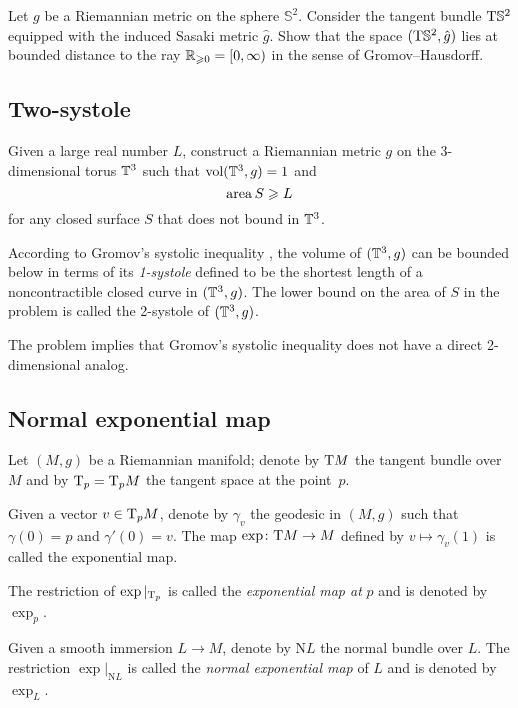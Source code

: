 \begin{pr}
Let $g$ be a Riemannian metric on the sphere $\mathbb{S}^2$.
Consider the tangent bundle $\mathrm{T} \mathbb{S}^2$ 
equipped with the induced Sasaki metric $\hat g$.
Show that
the space $(\mathrm{T} \mathbb{S}^2, \hat g)$ lies at bounded distance to the ray $\mathbb{R}_{\geqslant 0}=[0,\infty)$ in the sense of Gromov--Hausdorff.
\end{pr}


\subsection*{Two-systole}

\begin{pr} Given a large real number $L$,
construct a Riemannian metric $g$ on the 3-dimensional torus $\mathbb{T}^3$ such that $\operatorname{\rm vol}\nolimits(\mathbb{T}^3,g)=1$
and \[\operatorname{\rm area}\nolimits S\geqslant L\]
for any closed surface $S$ that does not bound in $\mathbb{T}^3$.
\end{pr}

According to Gromov's systolic inequality \cite{gromov-filling}, the volume of $(\mathbb{T}^3,g)$ can be bounded below in terms of its \emph{1-systole} defined to be the shortest length of a noncontractible closed curve in $(\mathbb{T}^3,g)$.
The lower bound on the area of $S$ in the problem is called the 2-systole of $(\mathbb{T}^3,g)$.

The problem implies that Gromov's systolic inequality does not have a direct 2-dimensional analog.

\subsection*{Normal exponential map\easy}
\label{Normal exponential map}
\label{page:Normal exponential map}

Let $(M,g)$ be a Riemannian manifold;
denote by $\mathrm{T} M$ the tangent bundle over $M$ and by $\mathrm{T}_p=\mathrm{T}_pM$ the tangent space at the point~$p$.

Given a vector $v\in\mathrm{T}_pM$, denote by $\gamma_v$ the geodesic in $(M,g)$
such that $\gamma(0)=p$ and $\gamma'(0)=v$.
The map $\exp\colon\mathrm{T} M\to M$ defined by $v\mapsto \gamma_v(1)$ is called the exponential map.

The restriction of $\exp|_{\mathrm{T}_p}$ is called the \emph{exponential map at} $p$ and is denoted by $\exp_p$.

Given a smooth immersion $L\to M$,
denote by $\mathrm{N} L$ the normal bundle over $L$.
The restriction $\exp|_{\mathrm{N} L}$ is called the {}\emph{normal exponential map} of $L$ and is denoted by $\exp_L$.

